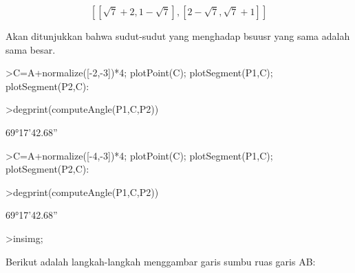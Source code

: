 \documentclass[a4paper,10pt]{article}
\begin{document}
\begin{eulernotebook}
\begin{eulercomment}
\begin{eulercomment}
\begin{euleroutput}
\end{euleroutput}
\begin{eulerformula}
\[
\left[ \left[ \sqrt{7}+2 , 1-\sqrt{7} \right]  , \left[ 2-\sqrt{7}
  , \sqrt{7}+1 \right]  \right] 
\]
\end{eulerformula}
\begin{eulercomment}
Akan ditunjukkan bahwa sudut-sudut yang menghadap bsuusr yang sama adalah sama besar.
\end{eulercomment}
\begin{eulerprompt}
>C=A+normalize([-2,-3])*4; plotPoint(C); plotSegment(P1,C); plotSegment(P2,C):
\end{eulerprompt}
\begin{eulerprompt}
>degprint(computeAngle(P1,C,P2))
\end{eulerprompt}
\begin{euleroutput}
  69°17'42.68''
\end{euleroutput}
\begin{eulerprompt}
>C=A+normalize([-4,-3])*4; plotPoint(C); plotSegment(P1,C); plotSegment(P2,C):
\end{eulerprompt}
\begin{eulerprompt}
>degprint(computeAngle(P1,C,P2))
\end{eulerprompt}
\begin{euleroutput}
  69°17'42.68''
\end{euleroutput}
\begin{eulerprompt}
>insimg;
\end{eulerprompt}
\begin{eulercomment}
Berikut adalah langkah-langkah menggambar garis sumbu ruas garis AB:


\end{eulercomment}
\end{eulercomment}
\end{eulercomment}
\end{eulernotebook}
\end{document}
